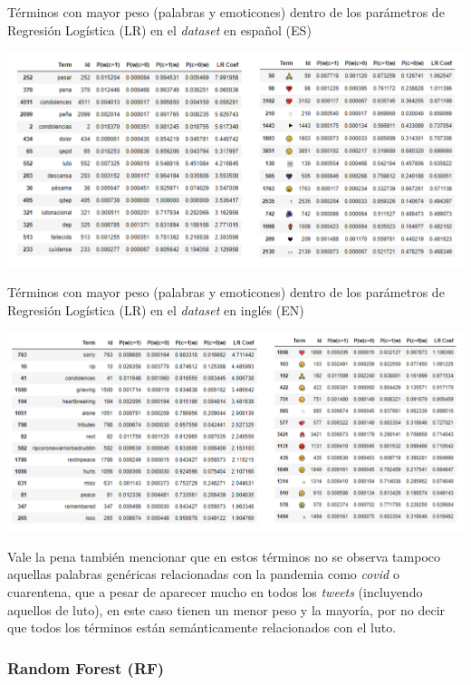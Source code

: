 \begin{table}[H]
    \centering
    \caption{Términos con mayor peso (palabras y emoticones) dentro de los parámetros de Regresión Logística (LR) en el \textit{dataset} en español (ES)}
    \label{tab:lr_coef_es}
    \includegraphics[width=\textwidth]{doc/images/LR_Coef_es.png}
\end{table}

\begin{table}[H]
    \centering
    \caption{Términos con mayor peso (palabras y emoticones) dentro de los parámetros de Regresión Logística (LR) en el \textit{dataset} en inglés (EN)}
    \label{tab:lr_coef_en}
    \includegraphics[width=\textwidth]{doc/images/LR_Coef_en.png}
\end{table}

Vale la pena también mencionar que en estos términos no se observa tampoco aquellas palabras genéricas relacionadas con la pandemia como \textit{covid} o cuarentena, que a pesar de aparecer mucho en todos los \textit{tweets} (incluyendo aquellos de luto), en este caso tienen un menor peso y la mayoría, por no decir que todos los términos están semánticamente relacionados con el luto. 

\subsubsection{Random Forest (RF)}

